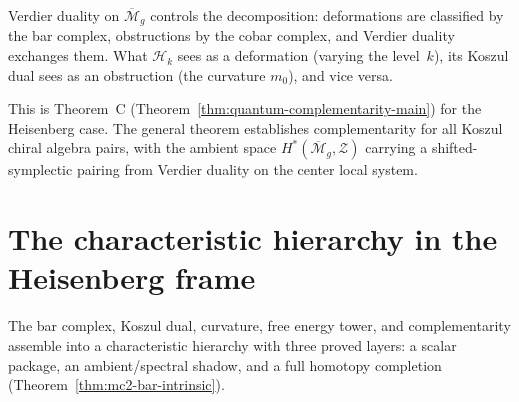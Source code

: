 Verdier duality on $\overline{\mathcal{M}}_g$ controls the
decomposition: deformations are classified by the bar complex,
obstructions by the cobar complex, and Verdier duality exchanges
them. What $\mathcal{H}_k$ sees as a deformation (varying the
level~$k$), its Koszul dual sees as an obstruction (the curvature
$m_0$), and vice versa.

This is Theorem~C
(Theorem~\ref{thm:quantum-complementarity-main})
for the Heisenberg case. The general theorem establishes
complementarity for all Koszul chiral algebra pairs, with the
ambient space $H^*(\overline{\mathcal{M}}_g, \mathcal{Z})$
carrying a shifted-symplectic pairing from Verdier duality on
the center local system.

\section{The characteristic hierarchy in the Heisenberg frame}
\label{sec:frame-modular-package}

The bar complex, Koszul dual, curvature, free energy tower, and
complementarity assemble into a characteristic hierarchy with three
proved layers: a scalar package, an ambient/spectral shadow, and a
full homotopy completion (Theorem~\ref{thm:mc2-bar-intrinsic}).

